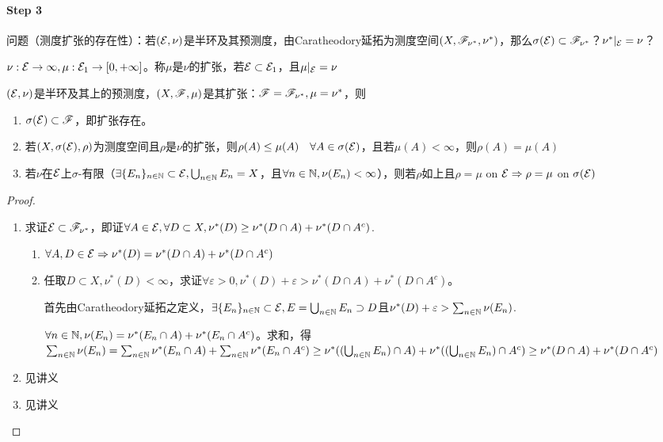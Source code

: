 \documentclass{ctexart}
\begin{document}
\paragraph{Step 3}
问题（测度扩张的存在性）：若$(\mathcal{E},\nu)$是半环及其预测度，由Caratheodory延拓为测度空间$(X,\mathscr{F}_{\nu^{*}},\nu^{*})$，那么$\sigma(\mathcal{E})\subset\mathscr{F}_{\nu^{*}}$？$\nu^{*}|_{\mathcal{E}}=\nu$？

\begin{Def}[集函数的扩张]
  $\nu:\mathcal{E}\to\infty,\mu:\mathcal{E}_{1}\to[0,+\infty]$。称$\mu$是$\nu$的扩张，若$\mathcal{E}\subset \mathcal{E}_{1}$，且$\mu|_{\mathcal{E}}=\nu$
\end{Def}

\begin{Thm}
  $(\mathcal{E},\nu)$是半环及其上的预测度，$(X,\mathscr{F},\mu)$是其扩张：$\mathscr{F}=\mathscr{F}_{\nu^{*}},\mu=\nu^{*}$，则
  \begin{enumerate}
  \item $\sigma(\mathcal{E})\subset\mathscr{F}$，即扩张存在。
  \item 若$(X,\sigma(\mathcal{E}),\rho)$为测度空间且$\rho$是$\nu$的扩张，则$\rho(A)\leq\mu(A)\quad\forall A\in\sigma(\mathcal{E})$，且若$\mu(A)<\infty$，则$\rho(A)=\mu(A)$
  \item 若$\nu$在$\mathcal{E}$上$\sigma$-有限（$\exists \{E_{n}\}_{n\in\mathbb{N}}\subset \mathcal{E},\bigcup_{n\in\mathbb{N}}E_{n}=X$，且$\forall n\in\mathbb{N},\nu(E_{n})<\infty$），则若$\rho$如上且$\rho=\mu$ on $\mathcal{E}\Rightarrow \rho=\mu$ on $\sigma(\mathcal{E})$
  \end{enumerate}
\end{Thm}

\begin{proof}
  \begin{enumerate}
  \item 求证$\mathcal{E}\subset \mathscr{F}_{\nu^{*}}$，即证$\forall A\in\mathcal{E},\forall D\subset X,\nu^{*}(D)\geq \nu^{*}(D\cap A)+\nu^{*}(D\cap A^{c})$.
    \begin{enumerate}
    \item $\forall A,D\in\mathcal{E}\Rightarrow \nu^{*}(D)=\nu^{*}(D\cap A)+\nu^{*}(D\cap A^{c})$
    \item 任取$D\subset X, \nu^{*}(D)<\infty$，求证$\forall\varepsilon>0, \nu^{*}(D)+\varepsilon>\nu^{*}(D\cap A)+\nu^{*}(D\cap A^{c})$。

      首先由Caratheodory延拓之定义，$\exists \{E_{n}\}_{n\in\mathbb{N}}\subset\mathcal{E},E=\bigcup_{n\in\mathbb{N}}E_{n}\supset D$且$\nu^{*}(D)+\varepsilon>\sum_{n\in\mathbb{N}}\nu(E_{n})$.

      $\forall n\in\mathbb{N},\nu(E_n)=\nu^{*}(E_{n}\cap A)+\nu^{*}(E_{n}\cap A^{c})$。求和，得$\sum_{n\in\mathbb{N}}\nu(E_{n})=\sum_{n\in\mathbb{N}}\nu^{*}(E_{n}\cap A)+\sum_{n\in\mathbb{N}}\nu^{*}(E_{n}\cap A^{c})\geq\nu^{*}((\bigcup_{n\in\mathbb{N}}E_{n})\cap A)+\nu^{*}((\bigcup_{n\in\mathbb{N}}E_{n})\cap A^{c})\geq \nu^{*}(D\cap A)+\nu^{*}(D\cap A^{c})$
    \end{enumerate}
    
  \item 见讲义
    
  \item 见讲义
  \end{enumerate}
\end{proof}
\end{document}
